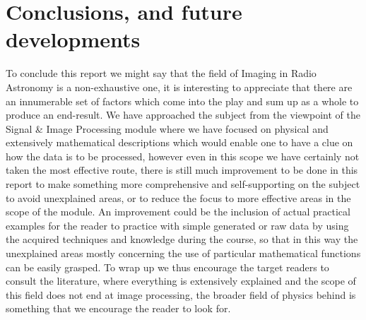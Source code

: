 \chapter{Conclusions, and future developments}
\label{ConclusionOnDissertation}
To conclude this report we might say that the field of Imaging in Radio Astronomy is a non-exhaustive one, it is interesting to appreciate that there are an innumerable set of factors which come into the play and sum up as a whole to produce an end-result. We have approached the subject from the viewpoint of the Signal \& Image Processing module where we have focused on physical and extensively mathematical descriptions which would enable one to have a clue on how the data is to be processed, however even in this scope we have certainly not taken the most effective route, there is still much improvement to be done in this report to make something more comprehensive and self-supporting on the subject to avoid unexplained areas, or to reduce the focus to more effective areas in the scope of the module. An improvement could be the inclusion of actual practical examples for the reader to practice with simple generated or raw data by using the acquired techniques and knowledge during the course, so that in this way the unexplained areas mostly concerning the use of particular mathematical functions can be easily grasped. To wrap up we thus encourage the target readers to consult the literature, where everything is extensively explained and the scope of this field does not end at image processing, the broader field of physics behind is something that we encourage the reader to look for. 